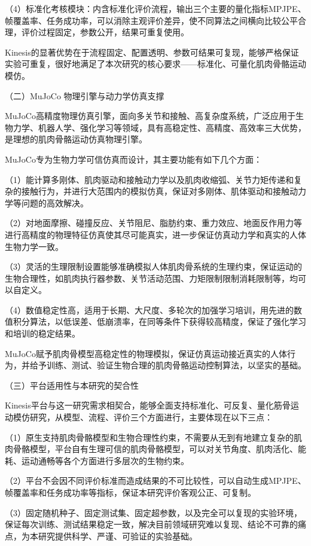 （4）标准化考核模块：内含标准化评价流程，输出三个主要的量化指标MPJPE、帧覆盖率、任务成功率，可以消除主观评价差异，使不同算法之间横向比较公平合理，评价过程固定，参数公开，结果可重复使用。

Kinesis的显著优势在于流程固定、配置透明、参数可结果可复现，能够严格保证实验可重复，很好地满足了本次研究的核心要求——标准化、可量化肌肉骨骼运动模仿。

（二）MuJoCo 物理引擎与动力学仿真支撑

MuJoCo高精度物理仿真引擎，面向多关节和接触、高复杂度系统，广泛应用于生物力学、机器人学、强化学习等领域，具有高稳定性、高精度、高效率三大优势，是理想的肌肉骨骼运动仿真物理引擎。

MuJoCo专为生物力学可信仿真而设计，其主要功能有如下几个方面：

（1）能计算多刚体、肌肉驱动和接触动力学以及肌肉收缩弧、关节力矩传递和复杂的接触行为，并进行大范围内的模拟仿真，保证对多刚体、肌体驱动和接触动力学等问题的高效解决。

（2）对地面摩擦、碰撞反应、关节阻尼、脂肪约束、重力效应、地面反作用力等进行高精度的物理特征仿真使其尽可能真实，进一步保证仿真动力学和真实的人体生物力学一致。

（3）灵活的生理限制设置能够准确模拟人体肌肉骨系统的生理约束，保证运动的生物合理性，如肌肉执行器参数、关节活动范围、力矩限制限制消耗限制等，均可以自定义。

（4）数值稳定性高，适用于长期、大尺度、多轮次的加强学习培训，用先进的数值积分算法，以低误差、低崩溃率，在同等条件下获得较高精度，保证了强化学习和培训的稳定结果。

MuJoCo赋予肌肉骨模型高稳定性的物理模拟，保证仿真运动接近真实的人体行为，并给予训练、测试、验证生物合理的肌肉骨骼运动控制算法，以坚实的基础。

（三）平台适用性与本研究的契合性

Kinesis平台与这一研究需求相契合，能够全面支持标准化、可反复、量化筋骨运动模仿研究，从模型、流程、评价三个方面进行，主要体现在以下三点：

（1）原生支持肌肉骨骼模型和生物合理性约束，不需要从无到有地建立复杂的肌肉骨骼模型，平台自有生理可信的肌肉骨骼模型，可以对关节角度、肌肉活化、能耗、运动通畅等各个方面进行多层次的生物约束。

（2）平台不会因不同评价标准而造成结果的不可比较性，可以自动生成MPJPE、帧覆盖率和任务成功率等指标，保证本研究评价客观公正、可复制。

（3）固定随机种子、固定测试集、固定超参数，以及完全可以复现的实验环境，保证每次训练、测试结果稳定一致，解决目前领域研究难以复现、结论不可靠的痛点，为本研究提供科学、严谨、可验证的实验基础。

